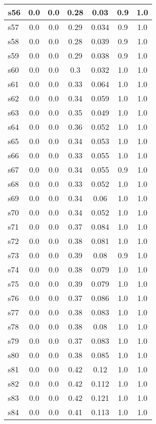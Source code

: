 \documentclass{article}
\begin{document}
\begin{tabular}{|l|c|c|c|c|c|c|}
\hline
s56 &0.0 & 0.0 & 0.28 & 0.03 & 0.9 & 1.0\\
\hline
s57 &0.0 & 0.0 & 0.29 & 0.034 & 0.9 & 1.0\\
\hline
s58 &0.0 & 0.0 & 0.28 & 0.039 & 0.9 & 1.0\\
\hline
s59 &0.0 & 0.0 & 0.29 & 0.038 & 0.9 & 1.0\\
\hline
s60 &0.0 & 0.0 & 0.3 & 0.032 & 1.0 & 1.0\\
\hline
s61 &0.0 & 0.0 & 0.33 & 0.064 & 1.0 & 1.0\\
\hline
s62 &0.0 & 0.0 & 0.34 & 0.059 & 1.0 & 1.0\\
\hline
s63 &0.0 & 0.0 & 0.35 & 0.049 & 1.0 & 1.0\\
\hline
s64 &0.0 & 0.0 & 0.36 & 0.052 & 1.0 & 1.0\\
\hline
s65 &0.0 & 0.0 & 0.34 & 0.053 & 1.0 & 1.0\\
\hline
s66 &0.0 & 0.0 & 0.33 & 0.055 & 1.0 & 1.0\\
\hline
s67 &0.0 & 0.0 & 0.34 & 0.055 & 0.9 & 1.0\\
\hline
s68 &0.0 & 0.0 & 0.33 & 0.052 & 1.0 & 1.0\\
\hline
s69 &0.0 & 0.0 & 0.34 & 0.06 & 1.0 & 1.0\\
\hline
s70 &0.0 & 0.0 & 0.34 & 0.052 & 1.0 & 1.0\\
\hline
s71 &0.0 & 0.0 & 0.37 & 0.084 & 1.0 & 1.0\\
\hline
s72 &0.0 & 0.0 & 0.38 & 0.081 & 1.0 & 1.0\\
\hline
s73 &0.0 & 0.0 & 0.39 & 0.08 & 0.9 & 1.0\\
\hline
s74 &0.0 & 0.0 & 0.38 & 0.079 & 1.0 & 1.0\\
\hline
s75 &0.0 & 0.0 & 0.39 & 0.079 & 1.0 & 1.0\\
\hline
s76 &0.0 & 0.0 & 0.37 & 0.086 & 1.0 & 1.0\\
\hline
s77 &0.0 & 0.0 & 0.38 & 0.083 & 1.0 & 1.0\\
\hline
s78 &0.0 & 0.0 & 0.38 & 0.08 & 1.0 & 1.0\\
\hline
s79 &0.0 & 0.0 & 0.37 & 0.083 & 1.0 & 1.0\\
\hline
s80 &0.0 & 0.0 & 0.38 & 0.085 & 1.0 & 1.0\\
\hline
s81 &0.0 & 0.0 & 0.42 & 0.12 & 1.0 & 1.0\\
\hline
s82 &0.0 & 0.0 & 0.42 & 0.112 & 1.0 & 1.0\\
\hline
s83 &0.0 & 0.0 & 0.42 & 0.121 & 1.0 & 1.0\\
\hline
s84 &0.0 & 0.0 & 0.41 & 0.113 & 1.0 & 1.0\\

\end{tabular}
\end{document}
